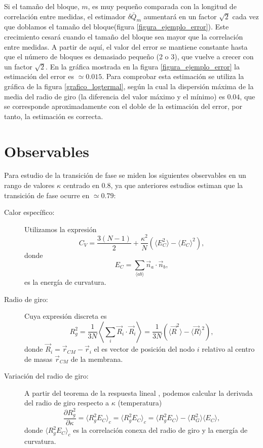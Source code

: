 Si el tamaño del bloque, $m$, es muy pequeño comparada con la longitud de
correlación entre medidas, el estimador $\delta\bar{Q}_m$ aumentará en un
factor $\sqrt{2}$ cada vez que doblamos el tamaño del bloque(figura
\ref{figura_ejemplo_error}). Este crecimiento cesará cuando el tamaño del
bloque sea mayor que la correlación entre medidas. A partir de aquí, el valor
del error se mantiene constante hasta que el número de bloques es demasiado
pequeño (2 o 3), que vuelve a crecer con un factor $\sqrt{2}$. En la gráfica
mostrada en la figura \ref{figura_ejemplo_error} la estimación del error es
$\simeq 0.015$. Para comprobar esta estimación se utiliza la gráfica de la
figura \ref{grafico_logtermal}, según la cual la
dispersión máxima de la media del radio de giro (la diferencia del valor máximo y el
mínimo) es $0.04$, que se corresponde aproximadamente con el doble de la
estimación del error, por tanto, la estimación es correcta.

\section{Observables}

Para estudio de la transición de fase se miden los siguientes observables en
un rango de valores $\kappa$ centrado en $0.8$, ya que anteriores estudios \cite{Bowick_flat_phase}
estiman que la transición de fase ocurre en $\simeq 0.79$:
\begin{description}
\item[Calor específico:] Utilizamos la expresión \cite{Harnish:CV}
\begin{equation}\label{CV_discreto}
 C_V=\frac{3(N-1)}{2}+\frac{\kappa^2}{N}(\langle E_C^2 \rangle-\langle E_C
\rangle^2),
\end{equation}
donde
\begin{equation}
E_C=\sum_{\langle ab \rangle}\vec{n}_a\cdot\vec{n}_b, 
\end{equation}
es la energía de curvatura.
\item[Radio de giro:] Cuya expresión discreta es 
\begin{equation} R_g^{2}=\frac{1}{3N}\left\langle \sum_{i}
  \vec{R}_i\cdot\vec{R}_i\right\rangle=\frac{1}{3N}(\langle\vec{R}^2 \rangle
-\langle\vec{R} \rangle^2),
\end{equation}
donde $\vec{R}_i=\vec{r}_{CM}-\vec{r}_i $ el es vector de posición del nodo
$i$ relativo al centro de masas $\vec{r}_{CM}$ de la membrana.

\item[Variación del radio de giro:] A partir del teorema de la respuesta
  lineal \cite{Binney:critical_phenomema}, podemos calcular la derivada del
  radio de giro respecto a $\kappa$ (temperatura) 
\begin{equation}
  \frac{\partial R_g^2}{\partial \kappa}=\langle R_g^2E_C \rangle_c=\langle
  R_g^2E_C \rangle_c=\langle R_g^2 E_C \rangle-\langle R_G^2\rangle\langle E_C\rangle,
\end{equation}
donde $\langle R_g^2E_C \rangle_c$ es la correlación conexa del radio de giro
y la energía de curvatura.
\end{description}

